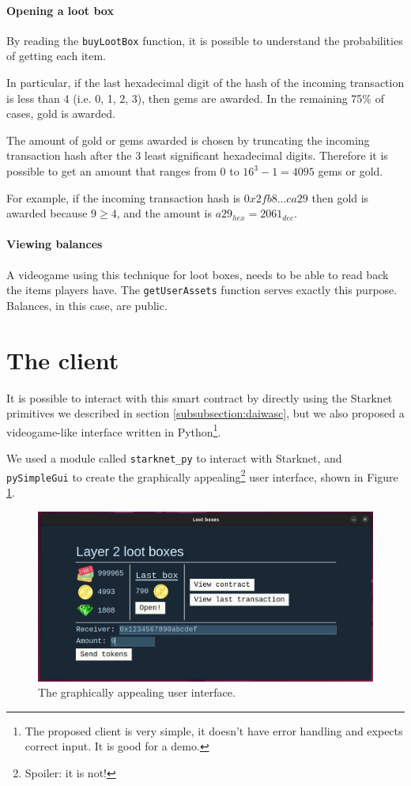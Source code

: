 \documentclass[12pt]{article}
\begin{document}
\paragraph{Opening a loot box}
By reading the \verb|buyLootBox| function, it is possible to understand the probabilities of getting each item. 

In particular, if the last hexadecimal digit of the hash of the incoming transaction is less than 4 (i.e. 0, 1, 2, 3), then gems are awarded. In the remaining 75\% of cases, gold is awarded.

The amount of gold or gems awarded is chosen by truncating the incoming transaction hash after the 3 least significant hexadecimal digits. Therefore it is possible to get an amount that ranges from \(0\) to \(16^3 - 1 = 4095\) gems or gold.

For example, if the incoming transaction hash is \(0x2fb8...ca29\) then gold is awarded because \(9 \geq 4\), and the amount is \(a29_{hex} = 2061_{dec}\).

\paragraph{Viewing balances}
A videogame using this technique for loot boxes, needs to be able to read back the items players have. The \verb|getUserAssets| function serves exactly this purpose. Balances, in this case, are public.

\section{The client} \label{section:the_client}
It is possible to interact with this smart contract by directly using the Starknet primitives we described in section \ref{subsubsection:daiwasc}, but we also proposed a videogame-like interface written in Python\footnote{The proposed client is very simple, it doesn't have error handling and expects correct input. It is good for a demo.}.

We used a module called \verb|starknet_py| to interact with Starknet, and \verb|pySimpleGui| to create the graphically appealing\footnote{Spoiler: it is not!} user interface, shown in Figure \ref{figure:client_user_interface}.
\begin{figure}[h]
    \centering
    \includegraphics[width=\textwidth]{client_user_interface} 
    \caption{The graphically appealing user interface.}
    \label{figure:client_user_interface}
\end{figure}
\end{document}
